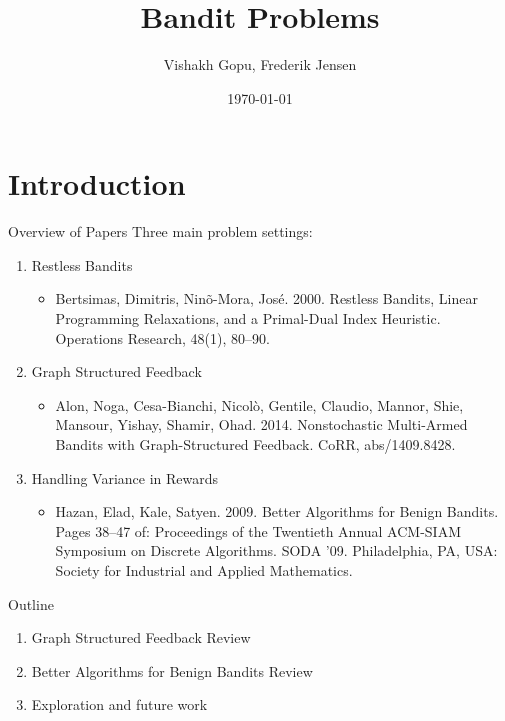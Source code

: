 \documentclass{beamer}
\title{Bandit Problems}
\date{\today}
\author{Vishakh Gopu, Frederik Jensen}
\institute{Advanced Machine Learning - Spring 2017}
\begin{document}
\maketitle


\section{Introduction}
\begin{frame}{Overview of Papers}   
  Three main problem settings: 
  \begin{enumerate}
  \item
    Restless Bandits
    \begin{itemize}
    \item
      Bertsimas, Dimitris, Nin\~o-Mora, Jos\'e. 2000. Restless Bandits, Linear Programming
      Relaxations, and a Primal-Dual Index Heuristic. Operations Research, 48(1), 80–90.
    \end{itemize}
  \item
    Graph Structured Feedback
    \begin{itemize}
    \item
      Alon, Noga, Cesa-Bianchi, Nicol\`o, Gentile, Claudio, Mannor, Shie, Mansour, Yishay,
      Shamir, Ohad. 2014. Nonstochastic Multi-Armed Bandits with Graph-Structured Feedback.
      CoRR, abs/1409.8428.
    \end{itemize}
  \item
    Handling Variance in Rewards
    \begin{itemize}
    \item
      Hazan, Elad, Kale, Satyen. 2009. Better Algorithms for Benign Bandits. Pages 38–47 of: 
      Proceedings of the Twentieth Annual ACM-SIAM Symposium on Discrete Algorithms. SODA '09.
      Philadelphia, PA, USA: Society for Industrial and Applied Mathematics.
    \end{itemize}
  \end{enumerate}
\end{frame}

\begin{frame}{Outline}
  \begin{enumerate}
  \item
    Graph Structured Feedback Review
  \item
    Better Algorithms for Benign Bandits Review
  \item
    Exploration and future work
    
  \end{enumerate}
\end{frame}
\end{document}

